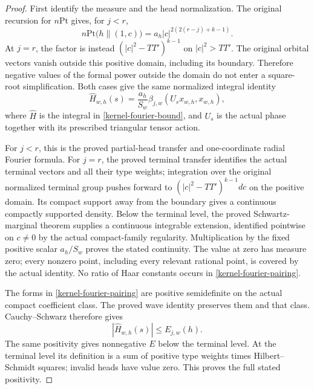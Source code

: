 \begin{proof}
First identify the measure and the head normalization.
The original recursion for $n\mathrm{Pt}$ gives, for $j<r$,
\[
 n\mathrm{Pt}\bigl(h\mathbin{\|}(1,c)\bigr)
       =a_h|c|^{2(2(r-j)+k-1)}.
\]
At $j=r$, the factor is instead
$(|c|^2-TT')^{k-1}$ on $|c|^2>TT'$.
The original orbital vectors vanish outside this positive
domain, including its boundary.  Therefore negative values
of the formal power outside the domain do not enter a
square-root simplification.  Both cases give the same
normalized integral identity
\begin{equation}\label{kernel-fourier-pairing}
 \widehat H_{w,h}(s)
   =\frac{a_h}{S_w}
      \beta_{j,w}(U_sx_{w,h},x_{w,h}),
\end{equation}
where $\widehat H$ is the integral in
\eqref{kernel-fourier-bound}, and $U_s$ is the actual
phase together with its prescribed triangular tensor action.

For $j<r$, this is the proved partial-head transfer and
one-coordinate radial Fourier formula.  For $j=r$, the
proved terminal transfer identifies the actual terminal
vectors and all their type weights; integration over the
original normalized terminal group pushes forward to
$(|c|^2-TT')^{k-1}dc$ on the positive domain.  Its compact
support away from the boundary gives a continuous compactly
supported density.  Below the terminal level, the proved
Schwartz-marginal theorem supplies a continuous integrable
extension, identified pointwise on $c\ne0$ by the actual
compact-family regularity.  Multiplication by the fixed
positive scalar $a_h/S_w$ proves the stated continuity.
The value at zero has measure zero; every nonzero point,
including every relevant rational point, is covered by
the actual identity.  No ratio of Haar constants occurs
in \eqref{kernel-fourier-pairing}.

The forms in \eqref{kernel-fourier-pairing} are positive
semidefinite on the actual compact coefficient class.
The proved wave identity preserves them and that class.
Cauchy--Schwarz therefore gives
\begin{equation}\label{kernel-fourier-unweighted}
                |\widehat H_{w,h}(s)|\le E_{j,w}(h).
\end{equation}
The same positivity gives nonnegative $E$ below the terminal
level.  At the terminal level its definition is a sum of
positive type weights times Hilbert--Schmidt squares; invalid
heads have value zero.  This proves the full stated positivity.


\end{proof}
